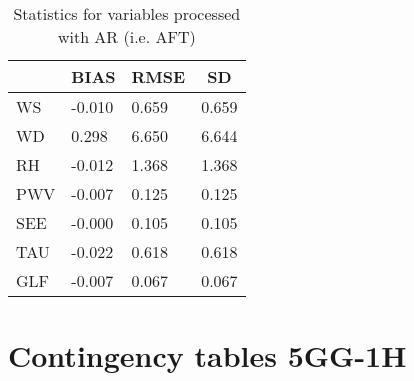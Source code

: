 \documentclass[11pt,english]{article}
\begin{document}
\begin{table}[]
\begin{center}
\begin{tabular}{|l|l|l|l|}
\hline
                            & \multicolumn{1}{c|}{\cellcolor[HTML]{C0C0C0}\textbf{BIAS}} & \multicolumn{1}{c|}{\cellcolor[HTML]{C0C0C0}\textbf{RMSE}} & \multicolumn{1}{c|}{\cellcolor[HTML]{C0C0C0}\textbf{SD}} \\\hline
\cellcolor[HTML]{C0C0C0}WS  &    -0.010                                &     0.659                                &     0.659                                \\
\cellcolor[HTML]{C0C0C0}WD  &     0.298                                &     6.650                                &     6.644                                \\
\cellcolor[HTML]{C0C0C0}RH  &    -0.012                                &     1.368                                &     1.368                                \\
\cellcolor[HTML]{C0C0C0}PWV &    -0.007                               &     0.125                               &     0.125                               \\
\cellcolor[HTML]{C0C0C0}SEE &    -0.000                               &     0.105                               &     0.105                               \\
\cellcolor[HTML]{C0C0C0}TAU &    -0.022                               &     0.618                               &     0.618                               \\
\cellcolor[HTML]{C0C0C0}GLF &    -0.007                               &     0.067                               &     0.067                               \\
\hline
\end{tabular}
\caption{Statistics for variables processed with AR (i.e. AFT)}
\end{center}
\end{table}
\clearpage
\section{Contingency tables 5GG-1H}
\clearpage
\end{document}
